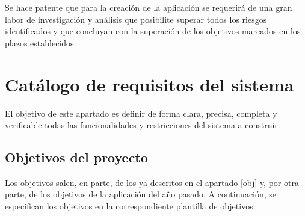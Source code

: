 Se hace patente que para la creación de la aplicación se requerirá de una gran labor de investigación y análisis que posibilite superar todos los riesgos identificados y que concluyan con la superación de los objetivos marcados en los plazos establecidos.
\newpage



\section{Catálogo de requisitos del sistema}
El objetivo de este apartado es definir de forma clara, precisa, completa y verificable todas las funcionalidades y restricciones del sistema a construir.

\subsection{Objetivos del proyecto}
Los objetivos salen, en parte, de los ya descritos en el apartado \ref{obj} y, por otra parte, de los objetivos de la aplicación del año pasado. A continuación, se especifican los objetivos en la correspondiente plantilla de objetivos:

